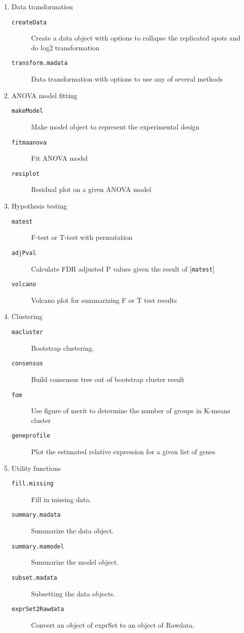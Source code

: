 \begin{enumerate}
\item Data transformation
\begin{description}
\item[{\tt createData}] Create a data object with options to 
collapse the replicated spots and do log2 transformation
\item[{\tt transform.madata}] Data transformation with options to use any of
several methods
\end{description}

\item ANOVA model fitting 
\begin{description}
\item[{\tt makeModel}] Make model object to represent the 
experimental design
\item[{\tt fitmaanova}] Fit ANOVA model
\item[{\tt resiplot}] Residual plot on a given ANOVA model
\end{description}

\item Hypothesis testing
\begin{description}
\item[{\tt matest}] F-test or T-test with permutation
\item[{\tt adjPval}] Calculate FDR adjusted P values given the 
result of [{\tt matest}]
\item[{\tt volcano}] Volcano plot for summarizing F or T test results
\end{description}

\item Clustering
\begin{description}
\item[{\tt macluster}] Bootstrap clustering.
\item[{\tt consensus}] Build consensus tree out of bootstrap cluster result
\item[{\tt fom}] Use figure of merit to determine the number of groups
in K-means cluster
\item[{\tt geneprofile}] Plot the estimated relative expression
for a given list of genes
\end{description}
\item Utility functions
\begin{description}
\item[{\tt fill.missing}] Fill in missing data.
\item[{\tt summary.madata}] Summarize the data object.
\item[{\tt summary.mamodel}] Summarize the model object.
\item[{\tt subset.madata}] Subsetting the data objects.
\item[{\tt exprSet2Rawdata}] Convert an object of exprSet to an object of Rawdata.
\end{description}

\end{enumerate}
 
